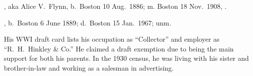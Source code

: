 \begin{Kids}
	, aka Alice V.\ Flynn, b.\ Boston 10 Aug.\ 1886; m. Boston 18 Nov.\ 1908, .
	
	, b.\ Boston 6 June 1889;\cite{Harry4FlynnBirth:2} d.\ Boston 15 Jan.\ 1967;\cite{Harry4FlynnDeath} unm.
	
	\begin{KidsMoreText}
		His WWI draft card lists his occupation as ``Collector'' and employer as ``R.\ H.\ Hinkley \& Co.'' He claimed a draft exemption due to being the main support for both his parents.\cite{Harry4FlynnDraft} In the 1930 census, he was living with his sister and brother-in-law and working as a salesman in advertising.\cite{Census1930HarryFlynn}
	\end{KidsMoreText}
	
\end{Kids}